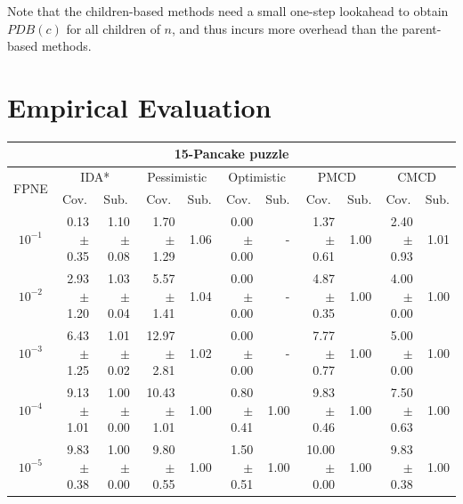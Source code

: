 \documentclass[letterpaper]{article}
\begin{document}
Note that the children-based methods need a small one-step lookahead to obtain $PDB(c)$ for all children of $n$, and thus incurs more overhead than the parent-based methods.









\section{Empirical Evaluation}








\begin{table}[t]
\centering
\setlength{\tabcolsep}{4 pt}
\begin{tabular}{| c | r  r | r  r | r  r | r  r | r  r |}
\hline
\multicolumn{11}{|c|}{\textbf{15-Pancake puzzle}} \\
\hline
\multirow{2}{*}{FPNE}	& \multicolumn{2}{|c|}{IDA*} 	& \multicolumn{2}{|c|}{Pessimistic} 	& \multicolumn{2}{|c|}{Optimistic} 	& \multicolumn{2}{|c|}{PMCD} 	& \multicolumn{2}{|c|}{CMCD} 	\\
\cline{2-11}
	& \multicolumn{1}{c}{Cov.} & \multicolumn{1}{c|}{Sub.} 	& \multicolumn{1}{c}{Cov.} & \multicolumn{1}{c|}{Sub.} 	& \multicolumn{1}{c}{Cov.} & \multicolumn{1}{c|}{Sub.} 	& \multicolumn{1}{c}{Cov.} & \multicolumn{1}{c|}{Sub.} 	& \multicolumn{1}{c}{Cov.} & \multicolumn{1}{c|}{Sub.} 	\\
\hline


$10^{-1}$	& 0.13 $\pm$ 0.35	& 1.10 $\pm$ 0.08	& 1.70 $\pm$ 1.29	& 1.06	& 0.00 $\pm$ 0.00	& - 	& 1.37 $\pm$ 0.61	& 1.00	& 2.40 $\pm$ 0.93	& 1.01	\\

$10^{-2}$	& 2.93 $\pm$ 1.20	& 1.03 $\pm$ 0.04	& 5.57 $\pm$ 1.41	& 1.04	& 0.00 $\pm$ 0.00	& - 	& 4.87 $\pm$ 0.35	& 1.00	& 4.00 $\pm$ 0.00	& 1.00	\\

$10^{-3}$	& 6.43 $\pm$ 1.25	& 1.01 $\pm$ 0.02	& 12.97 $\pm$ 2.81	& 1.02	& 0.00 $\pm$ 0.00	& - 	& 7.77 $\pm$ 0.77	& 1.00	& 5.00 $\pm$ 0.00	& 1.00	\\

$10^{-4}$	& 9.13 $\pm$ 1.01	& 1.00 $\pm$ 0.00	& 10.43 $\pm$ 1.01	& 1.00	& 0.80 $\pm$ 0.41	& 1.00	& 9.83 $\pm$ 0.46	& 1.00	& 7.50 $\pm$ 0.63	& 1.00	\\

$10^{-5}$	& 9.83 $\pm$ 0.38	& 1.00 $\pm$ 0.00	& 9.80 $\pm$ 0.55	& 1.00	& 1.50 $\pm$ 0.51	& 1.00	& 10.00 $\pm$ 0.00	& 1.00	& 9.83 $\pm$ 0.38	& 1.00	\\




\end{tabular}
\end{table}
\end{document}
